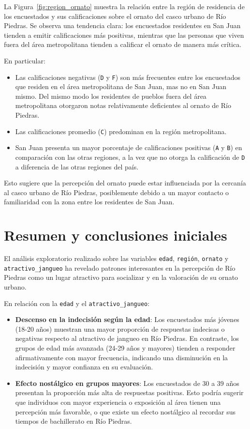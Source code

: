\documentclass[11pt]{article}
\begin{document}
La Figura~\ref{fig:region_ornato} muestra la relación entre la región de residencia de los encuestados y sus calificaciones sobre el ornato del casco urbano de Río Piedras. Se observa una tendencia clara: los encuestados residentes en San Juan tienden a emitir calificaciones más positivas, mientras que las personas que viven fuera del área metropolitana tienden a calificar el ornato de manera más crítica. 

En particular:
\begin{itemize}
    \item Las calificaciones negativas (\texttt{D} y \texttt{F}) son más frecuentes entre los encuestados que residen en el área metropolitana de San Juan, mas no en San Juan mismo. Del mismo modo los residentes de pueblos fuera del área metropolitana otorgaron notas relativamente deficientes al ornato de Río Piedras.
    \item Las calificaciones promedio (\texttt{C}) predominan en la región metropolitana.
    \item San Juan presenta un mayor porcentaje de calificaciones positivas (\texttt{A} y \texttt{B}) en comparación con las otras regiones, a la vez que no otorga la calificación de \texttt{D} a diferencia de las otras regiones del país.
\end{itemize}

Esto sugiere que la percepción del ornato puede estar influenciada por la cercanía al casco urbano de Río Piedras, posiblemente debido a un mayor contacto o familiaridad con la zona entre los residentes de San Juan.

\section{Resumen y conclusiones iniciales}

El análisis exploratorio realizado sobre las variables \texttt{edad}, \texttt{región}, \texttt{ornato} y \texttt{atractivo\_jangueo} ha revelado patrones interesantes en la percepción de Río Piedras como un lugar atractivo para socializar y en la valoración de su ornato urbano.

En relación con la \texttt{edad} y el \texttt{atractivo\_jangueo}:

\begin{itemize}
    \item \textbf{Descenso en la indecisión según la edad}: Los encuestados más jóvenes (18-20 años) muestran una mayor proporción de respuestas indecisas o negativas respecto al atractivo de jangueo en Río Piedras. En contraste, los grupos de edad más avanzada (24-29 años y mayores) tienden a responder afirmativamente con mayor frecuencia, indicando una disminución en la indecisión y mayor confianza en su evaluación.
    \item \textbf{Efecto nostálgico en grupos mayores}: Los encuestados de 30 a 39 años presentan la proporción más alta de respuestas positivas. Esto podría sugerir que individuos con mayor experiencia o exposición al área tienen una percepción más favorable, o que existe un efecto nostálgico al recordar sus tiempos de bachillerato en Río Piedras.
\end{itemize}
\end{document}
